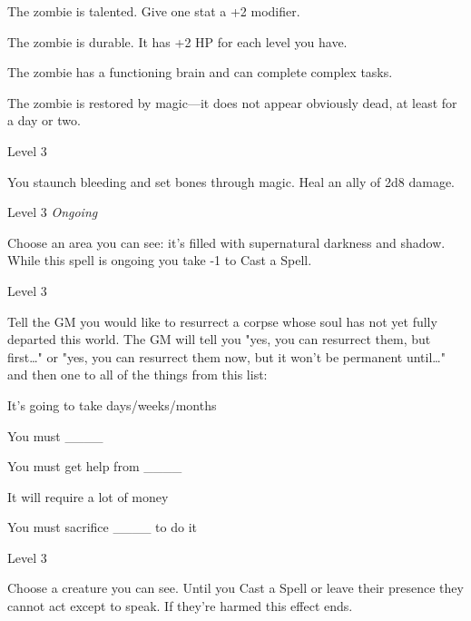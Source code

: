  
\startitemize[1,packed]

\item The zombie is talented. Give one stat a +2 modifier.

 
\item The zombie is durable. It has +2 HP for each level you have.

 
\item The zombie has a functioning brain and can complete complex tasks.

 
\item The zombie is restored by magic—it does not appear obviously dead, at least for a day or two.


\stopitemize
 
\startSpellName
{} 	Level 3
\stopSpellName
 

You staunch bleeding and set bones through magic. Heal an ally of 2d8 damage.

 
\startSpellName
{} 	Level 3	{\em Ongoing} 
\stopSpellName
 

Choose an area you can see: it's filled with supernatural darkness and shadow. While this spell is ongoing you take -1 to Cast a Spell.

 
\startSpellName
{} 	Level 3
\stopSpellName
 

Tell the GM you would like to resurrect a corpse whose soul has not yet fully departed this world. The GM will tell you "yes, you can resurrect them, but first…" or "yes, you can resurrect them now, but it won't be permanent until…" and then one to all of the things from this list:

 
\startitemize[1,packed]

\item It's going to take days/weeks/months

 
\item You must \_\_\_\_

 
\item You must get help from \_\_\_\_

 
\item It will require a lot of money

 
\item You must sacrifice \_\_\_\_ to do it


\stopitemize
 
\startSpellName
{} 	Level 3
\stopSpellName
 

Choose a creature you can see. Until you Cast a Spell or leave their presence they cannot act except to speak. If they're harmed this effect ends.



